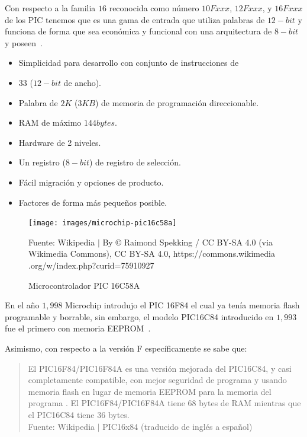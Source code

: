 \documentclass[conference]{IEEEtran}
\begin{document}
    Con respecto a la familia $16$ reconocida como número $10Fxxx$, $12Fxxx$,
    y $16Fxxx$ de los PIC tenemos que es una gama de entrada que utiliza
    palabras de $12-bit$ y funciona de forma que sea económica y funcional
    con una arquitectura de $8-bit$ y poseen~\cite{microchip-developer-help-2022}.

    \bigbreak

    \begin{itemize}
        \item Simplicidad para desarrollo con conjunto de instrucciones de
        \item $33$ ($12-bit$ de ancho).
        \item Palabra de $2K$ ($3KB$) de memoria de programación direccionable.
        \item RAM de máximo $144bytes$.
        \item Hardware de 2 niveles.
        \item Un registro ($8-bit$) de registro de selección.
        \item Fácil migración y opciones de producto.
        \item Factores de forma más pequeños posible.
    \end{itemize}

    \bigbreak

    \begin{figure}[H]
        \centering
        \texttt{[image: images/microchip-pic16c58a]}
        \caption{Microcontrolador PIC 16C58A} \footnotesize
        Fuente: Wikipedia $\mid$ By © Raimond Spekking / CC BY-SA 4.0 (via
        Wikimedia Commons), CC BY-SA 4.0, https://commons.wikimedia .org/w/index.php?curid=75910927~\cite{wikipedia-pic-2022}\label{fig:figure2}
    \end{figure}

    \bigbreak

    En el año $1,998$ Microchip introdujo el PIC 16F84 el cual ya tenía
    memoria flash programable y borrable, sin embargo, el modelo PIC16C84
    introducido en $1,993$ fue el primero con memoria EEPROM~\cite{wikipedia-pic-2022}.

    \bigbreak

    Asimismo, con respecto a la versión F específicamente se sabe que:

    \bigbreak

    \begin{quote}
        El PIC16F84/PIC16F84A es una versión mejorada del PIC16C84, y casi
        completamente compatible, con mejor seguridad de programa y usando
        memoria flash en lugar de memoria EEPROM para la memoria del programa
        . El PIC16F84/PIC16F84A tiene 68 bytes de RAM mientras que el
        PIC16C84 tiene 36 bytes.\\
        \small Fuente: Wikipedia $\mid$ PIC16x84 (traducido de inglés a
        español)~\cite{wikipedia-pc16x84-2020}
    \end{quote}
\end{document}
